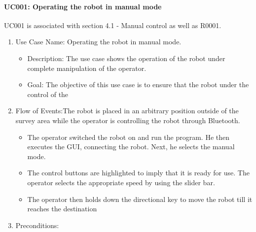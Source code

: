 \paragraph{UC001: Operating the robot in manual mode}
UC001 is associated with section 4.1 - Manual control as well as R0001.
\begin{enumerate}
	\item Use Case Name: Operating the robot in manual mode.
	\begin{itemize}	
		\item Description: The use case shows the operation of the robot under complete manipulation of the operator.
		\item Goal: The objective of this use case is to ensure that the robot under the control of the
	\end{itemize}
	\item Flow of Events:The robot is placed in an arbitrary position outside of the survey area while
	the operator is controlling the robot through Bluetooth.
	\begin{itemize}
		\item The operator switched the robot on and run the program. He then
	executes the GUI, connecting the robot. Next, he selects the manual mode.
		\item The control buttons are highlighted to imply that it is ready for use.
	The operator selects the appropriate speed by using the slider bar.
		\item The operator then holds down the directional key to move the robot till it reaches the destination		
	\end{itemize}
	\item Preconditions:
\end{enumerate}
